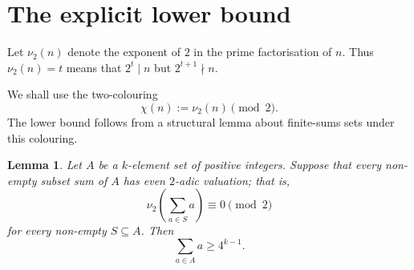 \documentclass[11pt]{article}
\newtheorem{lemma}[theorem]{Lemma}
\begin{document}
\section{The explicit lower bound}

Let $\nu_2(n)$ denote the exponent of $2$ in the prime factorisation of $n$. Thus $\nu_2(n)=t$ means that $2^t\mid n$ but $2^{t+1}\nmid n$.

We shall use the two-colouring
\[
    \chi(n):=\nu_2(n)\pmod 2.
\]
The lower bound follows from a structural lemma about finite-sums sets under this colouring.

\begin{lemma}\label{lem:evenval}
Let $A$ be a $k$-element set of positive integers. Suppose that every non-empty subset sum of $A$ has even $2$-adic valuation; that is,
\[
    \nu_2\left(\sum_{a\in S}a\right)\equiv 0\pmod 2
\]
for every non-empty $S\subseteq A$. Then
\[
    \sum_{a\in A}a\geq 4^{k-1}.
\]
\end{lemma}
\end{document}
